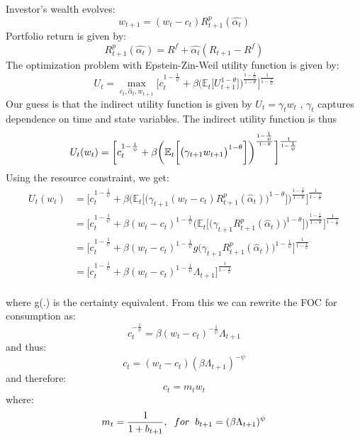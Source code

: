 \documentclass[12pt,a4paper]{article}
\begin{document}
Investor's wealth evolves:
\begin{equation*}
    w_{t+1}=(w_t-c_t)R^{p}_{t+1}(\hat{\alpha_t})
\end{equation*}
Portfolio return is given by:
\begin{equation*}
  R^{p}_{t+1}(\hat{\alpha_t})=R^f+ \hat{\alpha_t}(R_{t+1}-R^f)
\end{equation*}
The optimization problem with Epstein-Zin-Weil utility function is given by:
\begin{equation*}
    U_t=\max\limits_{c_{t},\hat{\alpha}_{t},w_{t+1}}\bigg[ c_t^{1-\frac{1}{\psi}}+ \beta\bigg(\mathbb{E}_t\bigg[U^{1-\theta}_{t+1}\bigg]\bigg)^{\frac{1-\frac{1}{\psi}}{1-\theta}}\bigg]^{\frac{1}{1-\frac{1}{\psi}}}
\end{equation*}
Our guess is that the indirect utility function is given by $U_t=\gamma_t w_t$
, $\gamma_t$ captures dependence on time and state variables.
The indirect utility function is thus 
\begin{equation*}
   U_t(w_t) = \bigg[ c_t^{1-\frac{1}{\psi}}+\beta\bigg(\mathbb{E}_t\bigg[\big(\gamma_{t+1}w_{t+1}\big)^{1-\theta}\bigg]\bigg)^\frac{1-\frac{1}{\psi}}{1-\theta}\bigg]^\frac{1}{1-\frac{1}{\psi}}\\
\end{equation*}
Using the resource constraint, we get: 
\begin{align*}
     U_t(w_t)&=\bigg[ c_t^{1-\frac{1}{\psi}}+\beta\bigg(\mathbb{E}_t\bigg[\big(\gamma_{t+1}(w_t-c_t)R^{p}_{t+1}(\hat{\alpha}_t)\big)^{1-\theta}\bigg]\bigg)^\frac{1-\frac{1}{\psi}}{1-\theta}\bigg]^\frac{1}{1-\frac{1}{\psi}}\\
     &=\bigg[ c_t^{1-\frac{1}{\psi}}+\beta(w_t-c_t)^{1-\frac{1}{\psi}}\bigg(\mathbb{E}_t\bigg[\big(\gamma_{t+1}R^{p}_{t+1}(\hat{\alpha}_t)\big)^{1-\theta}\bigg]\bigg)^\frac{1-\frac{1}{\psi}}{1-\theta}\bigg]^\frac{1}{1-\frac{1}{\psi}}\\
     &=\bigg[ c_t^{1-\frac{1}{\psi}}+\beta(w_t-c_t)^{1-\frac{1}{\psi}}g\big(\gamma_{t+1}R^{p}_{t+1}(\hat{\alpha}_t)\big)^{1-\frac{1}{\psi}}\bigg]^\frac{1}{1-\frac{1}{\psi}}\\
     &=\bigg[ c_t^{1-\frac{1}{\psi}}+\beta(w_t-c_t)^{1-\frac{1}{\psi}}\Lambda_{t+1}\bigg]^\frac{1}{1-\frac{1}{\psi}}\\
\end{align*}

where g(.) is the certainty equivalent. From this we can rewrite the FOC for consumption as:
\begin{equation*}
    c_t^{-\frac{1}{\psi}}=\beta(w_t-c_t)^{-\frac{1}{\psi}}\Lambda_{t+1}
\end{equation*}
and thus: 
\begin{equation*}
    c_t=(w_t-c_t)(\beta\Lambda_{t+1})^{-\psi}
\end{equation*}
and therefore: 
\begin{equation*}
    c_t=m_t w_t
\end{equation*}
where:
\begin{equation*}
    m_t=\frac{1}{1+b_{t+1}},\hspace{2mm} \text{$for$} \hspace{2mm} b_{t+1}=(\beta\Lambda_{t+1})^\psi
\end{equation*}
\end{document}
